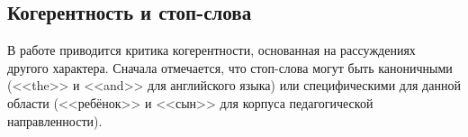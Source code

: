 








\subsection{Когерентность и стоп-слова}

В работе \cite{fan2019assessing} приводится критика когерентности, основанная на рассуждениях другого характера. Сначала отмечается, что стоп-слова могут быть каноничными (<<the>> и <<and>> для английского языка) или специфическими для данной области (<<ребёнок>> и <<сын>> для корпуса педагогической направленности).

